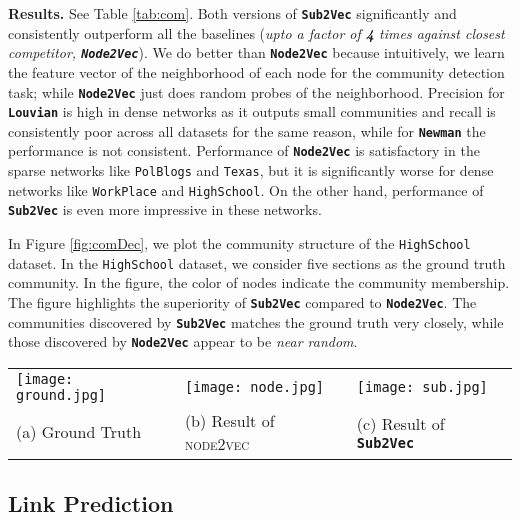 \documentclass[sigconf]{acmart}
\newcommand{\alg}{{\bf {\tt Sub2Vec}}\xspace}
\newcommand{\nodevec}{{\bf {\tt Node2Vec}}\xspace}
\newcommand{\newman}{{\bf {\tt Newman}}\xspace}
\newcommand{\dlouvian}{{\bf {\tt Louvian}}\xspace}
\newcommand{\workplace}{{\tt WorkPlace}\xspace}
\newcommand{\highschool}{{\tt HighSchool}\xspace}
\newcommand{\polblogs}{{\tt PolBlogs}\xspace}
\newcommand{\texas}{{\tt Texas}\xspace}
\begin{document}
\par \noindent
\textbf{Results.} 
See Table \ref{tab:com}. Both versions of \alg significantly and consistently outperform all the baselines (\emph{upto a factor of \textbf{4} times against closest competitor, \nodevec}). We do better than \nodevec because intuitively, we learn the feature vector of the neighborhood of each node for the community detection task; while \nodevec just does random probes of the neighborhood. Precision for \dlouvian is high in dense networks as it outputs small communities and recall is consistently poor across all datasets for the same reason, while  for \newman the performance is not consistent. Performance of \nodevec is satisfactory in the sparse networks like \polblogs and \texas, but it is significantly worse for dense networks like \workplace and \highschool. On the other hand, performance of \alg is even more impressive in these networks. 

In Figure \ref{fig:comDec}, we plot the community structure of the \highschool dataset.  In the \highschool dataset, we consider five sections as the ground truth community. In the figure, the color of nodes indicate the community membership. The figure highlights the superiority of \alg compared to \nodevec. The communities discovered by \alg matches the ground truth very closely, while those discovered by \nodevec appear to be \emph{near random}.


\begin{figure*}[htb]
\begin{center}

\begin{tabularx}{\textwidth}{>{\centering\arraybackslash}X>{\centering\arraybackslash}X>{\centering\arraybackslash}X}
		\texttt{[image: ground.jpg]} &
       \texttt{[image: node.jpg]} &
       \texttt{[image: sub.jpg]} \\
      (a) Ground Truth   & (b) Result of \textsc{node2vec} & (c) Result of \alg
    \end{tabularx}
\end{center}
\caption{\textbf{Visualization of community detection in dense \highschool network. Communities obtained by clustering ego-nets vectors returned by \alg matches the ground truth, while the result from \nodevec appears to be random.}}
\label{fig:comDec}
\end{figure*}




\subsection{Link Prediction}
\end{document}

